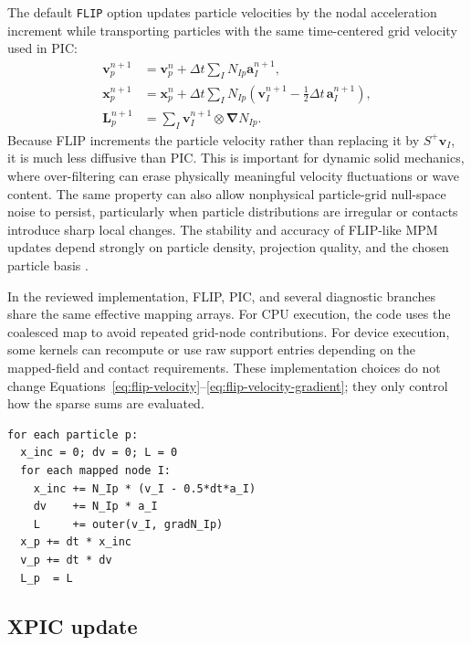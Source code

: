 The default \texttt{FLIP} option updates particle velocities by the nodal acceleration increment while transporting particles with the same time-centered grid velocity used in PIC:
\begin{align}
  \boldsymbol{v}^{n+1}_p
    &= \boldsymbol{v}^{n}_p
     +\Delta t\sum_I N_{Ip}\boldsymbol{a}^{n+1}_I,
  \label{eq:flip-velocity}\\
  \boldsymbol{x}^{n+1}_p
    &= \boldsymbol{x}^{n}_p
     +\Delta t\sum_I N_{Ip}\left(\boldsymbol{v}^{n+1}_I
       -\frac{1}{2}\Delta t\,\boldsymbol{a}^{n+1}_I\right),
  \label{eq:flip-position}\\
  \boldsymbol{L}^{n+1}_p
    &= \sum_I \boldsymbol{v}^{n+1}_I\otimes\boldsymbol{\nabla}N_{Ip}.
  \label{eq:flip-velocity-gradient}
\end{align}
Because FLIP increments the particle velocity rather than replacing it by $S^+\boldsymbol{v}_I$, it is much less diffusive than PIC.  This is important for dynamic solid mechanics, where over-filtering can erase physically meaningful velocity fluctuations or wave content.  The same property can also allow nonphysical particle-grid null-space noise to persist, particularly when particle distributions are irregular or contacts introduce sharp local changes.  The stability and accuracy of FLIP-like MPM updates depend strongly on particle density, projection quality, and the chosen particle basis \cite{brackbill1988flip,sulsky1995solid,wallstedt2007projection,wallstedt2008explicit}.

In the reviewed implementation, FLIP, PIC, and several diagnostic branches share the same effective mapping arrays.  For CPU execution, the code uses the coalesced map to avoid repeated grid-node contributions.  For device execution, some kernels can recompute or use raw support entries depending on the mapped-field and contact requirements.  These implementation choices do not change Equations~\eqref{eq:flip-velocity}--\eqref{eq:flip-velocity-gradient}; they only control how the sparse sums are evaluated.

\begin{lstlisting}[caption={FLIP grid-to-particle update.},basicstyle=\ttfamily\small]
for each particle p:
  x_inc = 0; dv = 0; L = 0
  for each mapped node I:
    x_inc += N_Ip * (v_I - 0.5*dt*a_I)
    dv    += N_Ip * a_I
    L     += outer(v_I, gradN_Ip)
  x_p += dt * x_inc
  v_p += dt * dv
  L_p  = L
\end{lstlisting}

\subsection{XPIC update}
\label{subsec:xpic-update}

